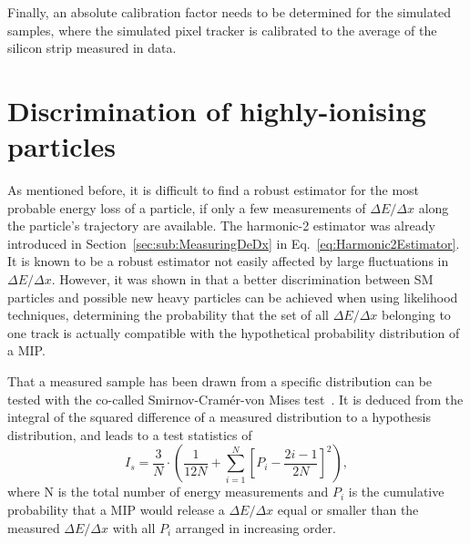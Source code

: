 Finally, an absolute calibration factor needs to be determined for the simulated samples, where the simulated pixel tracker is calibrated to the average \dedx of the silicon strip measured in data.


\section{Discrimination of highly-ionising particles}
\label{sec:Ias}

As mentioned before, it is difficult to find a robust estimator for the most probable energy loss of a particle, if only a few measurements of $\Delta E/ \Delta x$  along the particle's trajectory are available.
The harmonic-2 estimator \ihtwo was already introduced in Section~\ref{sec:sub:MeasuringDeDx} in Eq.~\eqref{eq:Harmonic2Estimator}.
It is known to be a robust estimator not easily affected by large fluctuations in $\Delta E/ \Delta x$.
However, it was shown in \cite{bib:Quertenmont_2010} that a better discrimination between SM particles and possible new heavy particles can be achieved when using likelihood techniques,
\ie determining the probability that the set of all $\Delta E/ \Delta x$ belonging to one track is actually compatible with the hypothetical probability distribution of a MIP.

That a measured sample has been drawn from a specific distribution can be tested with the co-called Smirnov-Cram\'{e}r-von Mises test~\cite{bib:Anderson:CramerVonMises_1962,bib:James:StaticticalMethods_2006}.
It is deduced from the integral of the squared difference of a measured distribution to a hypothesis distribution, 
and leads to a test statistics of~\cite{bib:Quertenmont_2010}
\begin{equation}
I_s = \frac{3}{N} \cdot \left( \frac{1}{12N} + \sum\limits_{i=1}^N \left[ P_i - \frac{2i-1}{2N} \right]^2 \right),
\end{equation}
where N is the total number of energy measurements and $P_i$ is the cumulative probability that a MIP would release a $\Delta E/\Delta x$ equal or smaller than the measured $\Delta E/ \Delta x$ with all $P_i$ arranged in increasing order.

